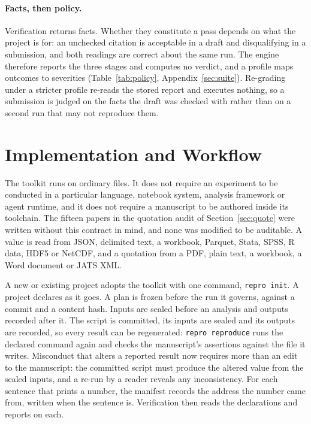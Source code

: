 \documentclass{article}
\newcommand{\code}[1]{\texttt{#1}}
\begin{document}
\paragraph{Facts, then policy.} Verification returns facts. Whether they constitute a pass depends
on what the project is for: an unchecked citation is acceptable in a draft and disqualifying in a
submission, and both readings are correct about the same run. The engine therefore reports the
three stages and computes no verdict, and a profile maps outcomes to severities
(Table~\ref{tab:policy}, Appendix~\ref{sec:suite}). Re-grading under
a stricter profile re-reads the stored report and executes nothing, so a submission is judged on
the facts the draft was checked with rather than on a second run that may not reproduce them.

\section{Implementation and Workflow}
\label{sec:use}

The toolkit runs on ordinary files. It does not require an experiment to be conducted in a
particular language, notebook system, analysis framework or agent runtime, and it does not require
a manuscript to be authored inside its toolchain. The fifteen papers in the quotation audit of Section~\ref{sec:quote} were
written without this contract in mind, and none was modified to be auditable. A value is read
from JSON, delimited text, a workbook, Parquet, Stata, SPSS, R data, HDF5 or NetCDF, and a
quotation from a PDF, plain text, a workbook, a Word document or JATS XML.

A new or existing project adopts the toolkit with one command, \code{repro init}. A project declares as it goes. A plan is frozen before the run it governs, against a commit and a
content hash. Inputs are sealed before an analysis and outputs recorded after it. The script is
committed, its inputs are sealed and its outputs are recorded, so every result can be regenerated:
\code{repro reproduce} runs the declared command again and checks the manuscript's assertions
against the file it writes. Misconduct that alters a reported result now requires more than an edit to the
manuscript: the committed script must produce the altered value from the sealed inputs, and a
re-run by a reader reveals any inconsistency. For each sentence that prints a number, the manifest records the address the number came from,
written when the sentence is. Verification then reads the declarations and reports on each.
\end{document}
